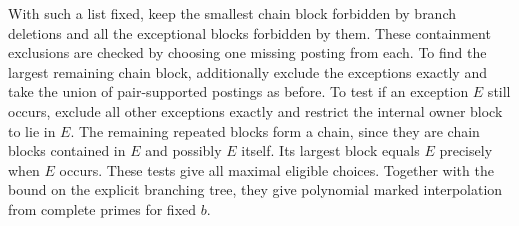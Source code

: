 With such a list fixed, keep the smallest chain
block forbidden by branch deletions and all the
exceptional blocks forbidden by them. These
containment exclusions are checked by choosing
one missing posting from each. To find the
largest remaining chain block, additionally
exclude the exceptions exactly and take the
union of pair-supported postings as before.
To test if an exception $E$ still occurs, exclude
all other exceptions exactly and restrict the
internal owner block to lie in $E$. The
remaining repeated blocks form a chain, since
they are chain blocks contained in $E$ and
possibly $E$ itself. Its largest block equals
$E$ precisely when $E$ occurs. These tests give
all maximal eligible choices. Together with
the bound on the explicit branching tree, they
give polynomial marked interpolation from
complete primes for fixed $b$.
